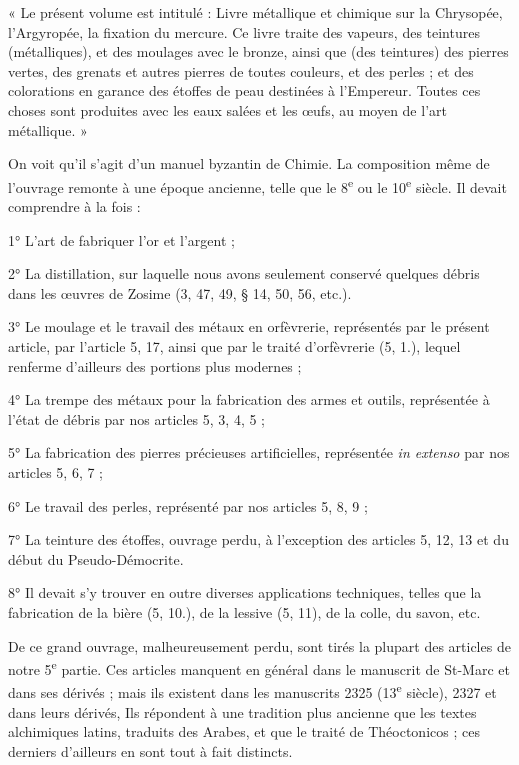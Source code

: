 \documentclass[a4paper, 11pt, oneside, polutonikogreek, french]{article}
\begin{document}
« Le présent volume est intitulé : Livre métallique et chimique sur la Chrysopée, l'Argyropée, la fixation du mercure. Ce livre traite des vapeurs, des teintures (métalliques), et des moulages avec le bronze, ainsi que (des teintures) des pierres vertes, des grenats et autres pierres de toutes couleurs, et des perles ; et des colorations en garance des étoffes de peau destinées à l'Empereur. Toutes ces choses sont produites avec les eaux salées et les œufs, au moyen de l'art métallique. »

On voit qu'il s'agit d'un manuel byzantin de Chimie. La composition même de l'ouvrage remonte à une époque ancienne, telle que le 8\textsuperscript{e} ou le 10\textsuperscript{e} siècle. Il devait comprendre à la fois :

1° L'art de fabriquer l'or et l'argent ;

2° La distillation, sur laquelle nous avons seulement conservé quelques débris dans les œuvres de Zosime (3, 47, 49, § 14, 50, 56, etc.).

3° Le moulage et le travail des métaux en orfèvrerie, représentés par le présent article, par l'article 5, 17, ainsi que par le traité d'orfèvrerie (5, 1.), lequel renferme d'ailleurs des portions plus modernes ;

4° La trempe des métaux pour la fabrication des armes et outils, représentée à l'état de débris par nos articles 5, 3, 4, 5 ;

5° La fabrication des pierres précieuses artificielles, représentée \emph{in extenso} par nos articles 5, 6, 7 ;

6° Le travail des perles, représenté par nos articles 5, 8, 9 ;

7° La teinture des étoffes, ouvrage perdu, à l'exception des articles 5, 12, 13 et du début du Pseudo-Démocrite.

8° Il devait s'y trouver en outre diverses applications techniques, telles que la fabrication de la bière (5, 10.), de la lessive (5, 11), de la colle, du savon, etc.

De ce grand ouvrage, malheureusement perdu, sont tirés la plupart des articles de notre 5\textsuperscript{e} partie. Ces articles manquent en général dans le manuscrit de St-Marc et dans ses dérivés ; mais ils existent dans les manuscrits 2325 (13\textsuperscript{e} siècle), 2327 et dans leurs dérivés, Ils répondent à une tradition plus ancienne que les textes alchimiques latins, traduits des Arabes, et que le traité de Théoctonicos ; ces derniers d'ailleurs en sont tout à fait distincts.
\end{document}

